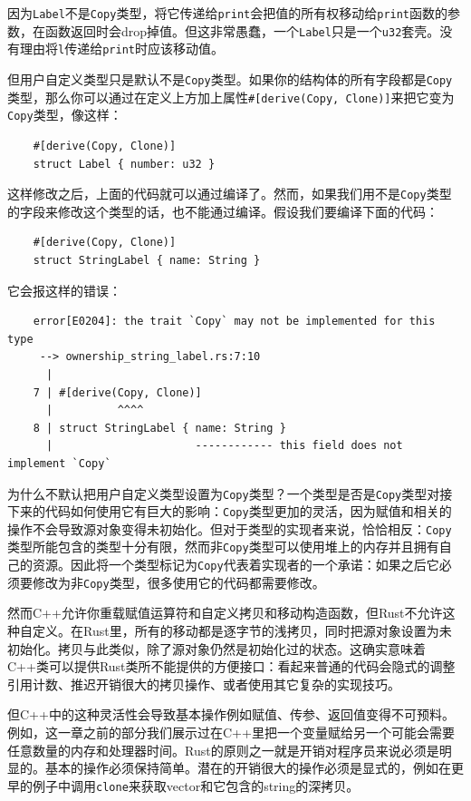 因为\texttt{Label}不是\texttt{Copy}类型，将它传递给\texttt{print}会把值的所有权移动给\texttt{print}函数的参数，在函数返回时会drop掉值。但这非常愚蠢，一个\texttt{Label}只是一个\texttt{u32}套壳。没有理由将\texttt{l}传递给\texttt{print}时应该移动值。

但用户自定义类型只是默认不是\texttt{Copy}类型。如果你的结构体的所有字段都是\texttt{Copy}类型，那么你可以通过在定义上方加上属性\texttt{\#[derive(Copy, Clone)]}来把它变为\texttt{Copy}类型，像这样：
\begin{verbatim}
    #[derive(Copy, Clone)]
    struct Label { number: u32 }
\end{verbatim}

这样修改之后，上面的代码就可以通过编译了。然而，如果我们用不是\texttt{Copy}类型的字段来修改这个类型的话，也不能通过编译。假设我们要编译下面的代码：
\begin{verbatim}
    #[derive(Copy, Clone)]
    struct StringLabel { name: String }
\end{verbatim}

它会报这样的错误：
\begin{verbatim}
    error[E0204]: the trait `Copy` may not be implemented for this type
     --> ownership_string_label.rs:7:10
      |
    7 | #[derive(Copy, Clone)]
      |          ^^^^
    8 | struct StringLabel { name: String }
      |                      ------------ this field does not implement `Copy`
\end{verbatim}

为什么不默认把用户自定义类型设置为\texttt{Copy}类型？一个类型是否是\texttt{Copy}类型对接下来的代码如何使用它有巨大的影响：\texttt{Copy}类型更加的灵活，因为赋值和相关的操作不会导致源对象变得未初始化。但对于类型的实现者来说，恰恰相反：\texttt{Copy}类型所能包含的类型十分有限，然而非\texttt{Copy}类型可以使用堆上的内存并且拥有自己的资源。因此将一个类型标记为\texttt{Copy}代表着实现者的一个承诺：如果之后它必须要修改为非\texttt{Copy}类型，很多使用它的代码都需要修改。

然而C++允许你重载赋值运算符和自定义拷贝和移动构造函数，但Rust不允许这种自定义。在Rust里，所有的移动都是逐字节的浅拷贝，同时把源对象设置为未初始化。拷贝与此类似，除了源对象仍然是初始化过的状态。这确实意味着C++类可以提供Rust类所不能提供的方便接口：看起来普通的代码会隐式的调整引用计数、推迟开销很大的拷贝操作、或者使用其它复杂的实现技巧。

但C++中的这种灵活性会导致基本操作例如赋值、传参、返回值变得不可预料。例如，这一章之前的部分我们展示过在C++里把一个变量赋给另一个可能会需要任意数量的内存和处理器时间。Rust的原则之一就是开销对程序员来说必须是明显的。基本的操作必须保持简单。潜在的开销很大的操作必须是显式的，例如在更早的例子中调用\texttt{clone}来获取vector和它包含的string的深拷贝。

